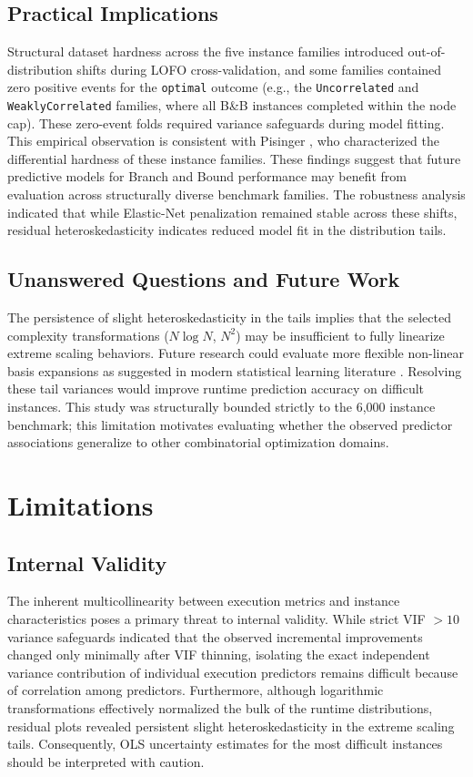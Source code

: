 \documentclass[11pt,a4paper]{article}
\begin{document}
\subsection{Practical Implications}
Structural dataset hardness across the five instance families introduced out-of-distribution shifts during LOFO cross-validation, and some families contained zero positive events for the \texttt{optimal} outcome (e.g., the \texttt{Uncorrelated} and \texttt{WeaklyCorrelated} families, where all B\&B instances completed within the node cap). These zero-event folds required variance safeguards during model fitting. This empirical observation is consistent with Pisinger \cite{Pisinger2005}, who characterized the differential hardness of these instance families. These findings suggest that future predictive models for Branch and Bound performance may benefit from evaluation across structurally diverse benchmark families. The robustness analysis indicated that while Elastic-Net penalization remained stable across these shifts, residual heteroskedasticity indicates reduced model fit in the distribution tails.

\subsection{Unanswered Questions and Future Work}
The persistence of slight heteroskedasticity in the tails implies that the selected complexity transformations ($N \log N$, $N^2$) may be insufficient to fully linearize extreme scaling behaviors. Future research could evaluate more flexible non-linear basis expansions as suggested in modern statistical learning literature \cite{Hastie2009}. Resolving these tail variances would improve runtime prediction accuracy on difficult instances. This study was structurally bounded strictly to the 6,000 instance benchmark; this limitation motivates evaluating whether the observed predictor associations generalize to other combinatorial optimization domains.

\section{Limitations}

\subsection{Internal Validity}
The inherent multicollinearity between execution metrics and instance characteristics poses a primary threat to internal validity. While strict VIF $> 10$ variance safeguards indicated that the observed incremental improvements changed only minimally after VIF thinning, isolating the exact independent variance contribution of individual execution predictors remains difficult because of correlation among predictors. Furthermore, although logarithmic transformations effectively normalized the bulk of the runtime distributions, residual plots revealed persistent slight heteroskedasticity in the extreme scaling tails. Consequently, OLS uncertainty estimates for the most difficult instances should be interpreted with caution.
\end{document}
